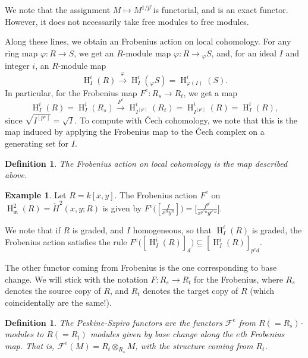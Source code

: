 \documentclass[11pt]{book}
\newtheorem{definition}[theorem]{Definition}
\numberwithin{equation}{section}
\numberwithin{theorem}{chapter}
\theoremstyle{definition}
\newtheorem{example}[theorem]{Example}
\newtheorem*{basic properties}{Basic Properties}
\newtheorem*{Important Remark}{Important Remark}
\theoremstyle{remark}
\newcommand{\m}{\mathfrak{m}}
\newcommand{\cF}{\mathcal{F}}
\renewcommand{\H}{\operatorname{H}}
\begin{document}
We note that the assignment $M\mapsto M^{1/p^e}$is functorial, and is an exact functor. However, it does not necessarily take free modules to free modules.

Along these lines, we obtain an Frobenius action on local cohomology. For any ring map $\varphi:R\to S$, we get an $R$-module map $\varphi:R\to {}_{\varphi}S$, and, for an ideal $I$ and integer $i$, an $R$-module map
\[ \H^i_I(R) \stackrel{\varphi}{\longrightarrow} \H^i_I({}_{\varphi}S)= \H^i_{\varphi(I)}(S). \]
In particular, for the Frobenius map $F^e:R_s\to R_t$, we get a map
\[ \H^i_I(R) = \H^i_I(R_s) \stackrel{F^e}{\longrightarrow} \H^i_{I^{[p^e]}}(R_t) = \H^i_{I^{[p^e]}}(R) = \H^i_{I}(R),\]
since $\sqrt{I^{[p^e]}}=\sqrt{I}$. To compute with \v Cech cohomology, we note that this is the map induced by applying the Frobenius map to the \v Cech complex on a generating set for $I$.
\begin{definition}
	The \emph{Frobenius action on local cohomology} is the map described above.
\end{definition}
\begin{example}
	Let $R=k[x,y]$. The Frobenius action $F^e$ on $\H^2_{\m}(R)=\check{H}^2(x,y;R)$ is given by $F^e\big([\frac{f}{x^n y^n}]\big)=\big[\frac{f^{p^e}}{x^{p^e n} y^{p^e n}}\big]$.
\end{example}

We note that if $R$ is graded, and $I$ homogeneous, so that $\H^i_I(R)$ is graded, the Frobenius action satisfies the rule $F^e\big( [\H^i_I(R)]_d \big) \subseteq [\H^i_I(R)]_{p^e d}$.

The other functor coming from Frobenius is the one corresponding to base change. We will stick with the notation $F:R_s \to R_t$ for the Frobenius, where $R_s$ denotes the source copy of $R$, and $R_t$ denotes the target copy of $R$ (which coincidentally are the same!).

\begin{definition}
	The \emph{Peskine-Szpiro functors}\index{$\cF^e(M)$} are the functors $\cF^e$ from $R(=R_s)$-modules to $R(=R_t)$ modules given by base change along the $e$th Frobenius map. That is, $\cF^e(M)=R_t \otimes_{R_s} M$, with the structure coming from $R_t$.
\end{definition}
\end{document}
